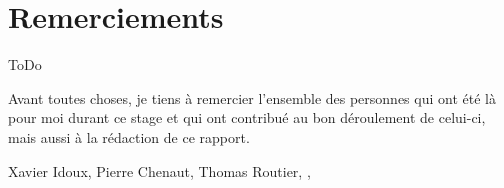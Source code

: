 \section*{Remerciements}


ToDo

\vspace{12pt}

Avant toutes choses, je tiens à remercier l'ensemble des personnes qui ont été là pour moi durant ce stage
et qui ont contribué au bon déroulement de celui-ci, mais aussi à la rédaction de ce rapport.

\vspace{12pt}

Xavier Idoux, Pierre Chenaut, Thomas Routier, \MaitreApp, \TuteurEns


